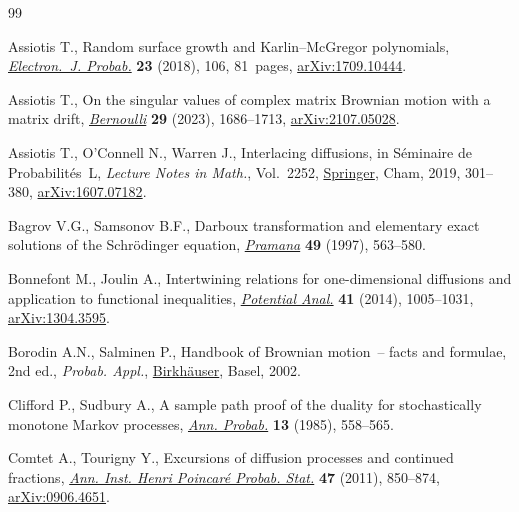 \documentclass[pdftex]{sigma}
\numberwithin{equation}{section}
\theoremstyle{definition}
\begin{document}
\begin{thebibliography}{99}
\footnotesize\itemsep=0pt

Assiotis T., Random surface growth and {K}arlin--{M}c{G}regor polynomials,
 \href{https://doi.org/10.1214/18-ejp236}{\textit{Electron.~J. Probab.}}
 \textbf{23} (2018), 106, 81~pages,
 \href{http://arxiv.org/abs/1709.10444}{arXiv:1709.10444}.

Assiotis T., On the singular values of complex matrix {B}rownian motion with a
 matrix drift, \href{https://doi.org/10.3150/22-bej1517}{\textit{Bernoulli}}
 \textbf{29} (2023), 1686--1713,
 \href{http://arxiv.org/abs/2107.05028}{arXiv:2107.05028}.

Assiotis T., O'Connell N., Warren J., Interlacing diffusions, in S\'eminaire de
 {P}robabilit\'es~{L}, \textit{Lecture Notes in Math.}, Vol.~2252,
 \href{https://doi.org/10.1007/978-3-030-28535-7_13}{Springer}, Cham, 2019,
 301--380, \href{http://arxiv.org/abs/1607.07182}{arXiv:1607.07182}.

Bagrov V.G., Samsonov B.F., Darboux transformation and elementary exact
 solutions of the {S}chr\"odinger equation,
 \href{https://doi.org/10.1007/BF02848330}{\textit{Pramana}} \textbf{49}
 (1997), 563--580.

Bonnefont M., Joulin A., Intertwining relations for one-dimensional diffusions
 and application to functional inequalities,
 \href{https://doi.org/10.1007/s11118-014-9408-7}{\textit{Potential Anal.}}
 \textbf{41} (2014), 1005--1031,
 \href{http://arxiv.org/abs/1304.3595}{arXiv:1304.3595}.

Borodin A.N., Salminen P., Handbook of {B}rownian motion~-- facts and formulae,
 2nd ed., \textit{Probab. Appl.},
 \href{https://doi.org/10.1007/978-3-0348-8163-0}{Birkh\"auser}, Basel, 2002.

Clifford P., Sudbury A., A sample path proof of the duality for stochastically
 monotone {M}arkov processes,
 \href{https://doi.org/10.1214/aop/1176993008}{\textit{Ann. Probab.}}
 \textbf{13} (1985), 558--565.

Comtet A., Tourigny Y., Excursions of diffusion processes and continued
 fractions, \href{https://doi.org/10.1214/10-AIHP390}{\textit{Ann. Inst. Henri
 Poincar\'e Probab. Stat.}} \textbf{47} (2011), 850--874,
 \href{http://arxiv.org/abs/0906.4651}{arXiv:0906.4651}.


\end{thebibliography}
\end{document}
